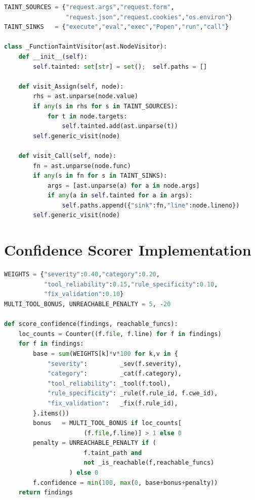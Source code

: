 \begin{samepage}
\begin{lstlisting}[language=Python, basicstyle=\footnotesize\ttfamily, caption={Taint Analysis --- Source/Sink Detection}]
TAINT_SOURCES = {"request.args","request.form",
                 "request.json","request.cookies","os.environ"}
TAINT_SINKS   = {"execute","eval","exec","Popen","run","call"}

class _FunctionTaintVisitor(ast.NodeVisitor):
    def __init__(self):
        self.tainted: set[str] = set();  self.paths = []

    def visit_Assign(self, node):
        rhs = ast.unparse(node.value)
        if any(s in rhs for s in TAINT_SOURCES):
            for t in node.targets:
                self.tainted.add(ast.unparse(t))
        self.generic_visit(node)

    def visit_Call(self, node):
        fn = ast.unparse(node.func)
        if any(s in fn for s in TAINT_SINKS):
            args = [ast.unparse(a) for a in node.args]
            if any(a in self.tainted for a in args):
                self.paths.append({"sink":fn,"line":node.lineno})
        self.generic_visit(node)
\end{lstlisting}
\end{samepage}


\section{Confidence Scorer Implementation}
\label{sec:confidence_impl}

\begin{lstlisting}[language=Python, basicstyle=\footnotesize\ttfamily, caption={Confidence Scoring Core Logic (abbreviated)}]
WEIGHTS = {"severity":0.40,"category":0.20,
           "tool_reliability":0.15,"rule_specificity":0.10,
           "fix_validation":0.10}
MULTI_TOOL_BONUS, UNREACHABLE_PENALTY = 5, -20

def score_confidence(findings, reachable_funcs):
    loc_counts = Counter((f.file, f.line) for f in findings)
    for f in findings:
        base = sum(WEIGHTS[k]*v*100 for k,v in {
            "severity":         _sev(f.severity),
            "category":         _cat(f.category),
            "tool_reliability": _tool(f.tool),
            "rule_specificity": _rule(f.rule_id, f.cwe_id),
            "fix_validation":   _fix(f.rule_id),
        }.items())
        bonus   = MULTI_TOOL_BONUS if loc_counts[
                      (f.file,f.line)] > 1 else 0
        penalty = UNREACHABLE_PENALTY if (
                      f.taint_path and
                      not _is_reachable(f,reachable_funcs)
                  ) else 0
        f.confidence = min(100, max(0, base+bonus+penalty))
    return findings
\end{lstlisting}

